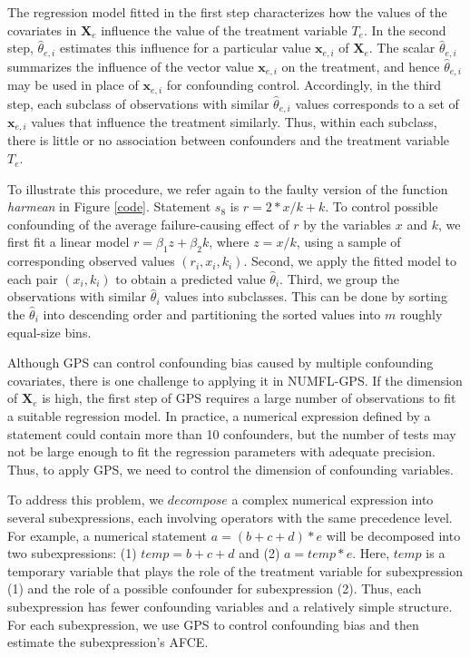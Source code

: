 \documentclass[times]{stvrauth}
\begin{document}
The regression model fitted in the first step characterizes how the values of the covariates in $\pmb{X}_e$ influence the value of the treatment variable $T_e$.  In the second step, $\hat{\theta}_{e,i}$ estimates this influence for a particular value $\pmb{x}_{e,i}$ of $\pmb{X}_e$.  The scalar $\hat{\theta}_{e,i}$ summarizes the influence of the vector value $\pmb{x}_{e,i}$ on the treatment, and hence $\hat{\theta}_{e,i}$ may be used in place of $\pmb{x}_{e,i}$ for confounding control. Accordingly, in the third step, each subclass of observations with similar $\hat{\theta}_{e,i}$ values corresponds to a set of $\pmb{x}_{e,i}$ values that influence the treatment similarly. Thus, within each subclass, there is little or no association between confounders and the treatment variable $T_e$.

To illustrate this procedure, we refer again to the faulty version of the function {\it harmean} in Figure \ref{code}.  Statement $s_8$ is $r=2*x/k +k$. To control possible confounding of the average failure-causing effect of $r$ by the variables $x$ and $k$, we first fit a linear model $r=\beta_1 z+\beta_2 k$, where $z=x/k$, using a sample of corresponding observed values $(r_i,x_i,k_i)$. Second, we apply the fitted model to each pair $(x_i,k_i)$ to obtain a predicted value $\hat \theta_i$.  Third, we group the observations with similar $\hat \theta_i$ values into subclasses. This can be done by sorting the $\hat \theta_i$ into descending order and partitioning the sorted values into $m$ roughly equal-size bins.

Although GPS can control confounding bias caused by multiple confounding covariates, there is one challenge to applying it in NUMFL-GPS. If the dimension of $\pmb{X}_e$ is high, the first step of GPS requires a large number of observations to fit a suitable regression model.  In practice, a numerical expression defined by a statement could contain more than 10 confounders, but the number of tests may not be large enough to fit the regression parameters with adequate precision. Thus, to apply GPS, we need to control the dimension of confounding variables.

To address this problem, we $decompose$ a complex numerical expression into several subexpressions, each involving operators with the same precedence level.  For example, a numerical statement $a=(b+c+d)*e$ will be decomposed into two subexpressions: (1) $temp=b+c+d$ and (2) $a=temp*e$.  Here, $temp$ is a temporary variable that plays the role of the treatment variable for subexpression (1) and the role of a possible confounder for subexpression (2). Thus, each subexpression has fewer confounding variables and a relatively simple structure.  For each subexpression, we use GPS to control confounding bias and then estimate the subexpression's AFCE.
\end{document}
